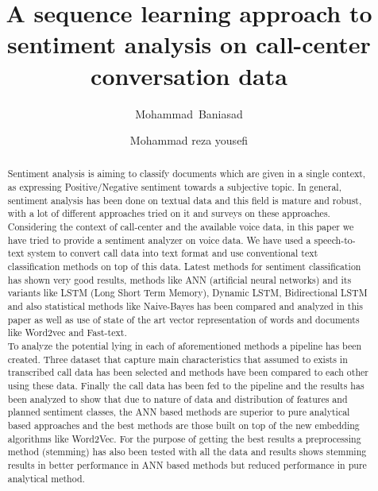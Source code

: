 \title{A sequence learning approach to sentiment analysis on call-center conversation data}
%
%
\author{Mohammad~Baniasad \and Mohammad reza yousefi}
%
%

\maketitle              %

\begin{abstract}
	Sentiment analysis is aiming to classify documents which are given in a single context, as expressing Positive/Negative sentiment towards a subjective topic. In general, sentiment analysis has been done on textual data and this field is mature and robust, with a lot of different approaches tried on it and surveys on these approaches\cite{einshams}. Considering the context of call-center and the available voice data, in this paper we have tried to provide a sentiment analyzer on voice data. We have used a speech-to-text system to convert call data into text format and use conventional text classification methods on top of this data. Latest methods for sentiment classification has shown very good results, methods like ANN (artificial neural networks) and its variants like LSTM (Long Short Term Memory), Dynamic LSTM, Bidirectional LSTM and also statistical methods like Naive-Bayes\cite{naiveBayes} has been compared and analyzed in this paper as well as use of state of the art vector representation of words and documents like Word2vec\cite{explainW2V} and Fast-text\cite{enrichWordvecs-with-subwords}.\\ To analyze the potential lying in each of aforementioned methods a pipeline has been created. Three dataset that capture main characteristics that assumed to exists in transcribed call data has been selected and methods have been compared to each other using these data. Finally the call data has been fed to the pipeline and the results has been analyzed to show that due to nature of data and distribution of features and planned sentiment classes, the ANN based methods are superior to pure analytical based approaches and the best methods are those built on top of the new embedding algorithms like Word2Vec. For the purpose of getting the best results a preprocessing method (stemming) has also been tested with all the data and results shows stemming results in better performance in ANN based methods but reduced performance in pure analytical method. 

\end{abstract}


